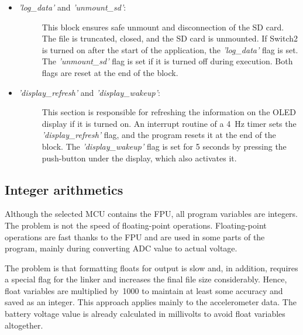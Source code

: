 \begin{itemize}
\begin{description}
At the end of the block, both flags are reset. A \SI{50}{\Hz} timer triggers ADCs themselves.
\end{description}

	\item \begin{description}
\item[\textit{'log\_data'} and \textit{'unmount\_sd'}:]
This block ensures safe unmount and disconnection of the SD card. The file is truncated, closed, and the SD card is unmounted. If Switch2 is turned on after the start of the application, the \textit{'log\_data'} flag is set. The \textit{'unmount\_sd'} flag is set if it is turned off during execution. Both flags are reset at the end of the block.
\end{description}

	\item \begin{description}
\item[\textit{'display\_refresh'} and \textit{'display\_wakeup'}:]
This section is responsible for refreshing the information on the OLED display if it is turned on. An interrupt routine of a \SI{4}{\Hz} timer sets the \textit{'display\_refresh'} flag, and the program resets it at the end of the block. The \textit{'display\_wakeup'} flag is set for 5 seconds by pressing the push-button under the display, which also activates it.
\end{description}

\end{itemize}


\subsection{Integer arithmetics}
\label{sub:integers}
Although the selected MCU contains the FPU, all program variables are integers. The problem is not the speed of floating-point operations. Floating-point operations are fast thanks to the FPU and are used in some parts of the program, mainly during converting ADC value to actual voltage.

The problem is that formatting floats for output is slow and, in addition, requires a special flag for the linker and increases the final file size considerably. Hence, float variables are multiplied by~1000 to maintain at least some accuracy and saved as an integer. This approach applies mainly to the accelerometer data. The battery voltage value is already calculated in millivolts to avoid float variables altogether.

